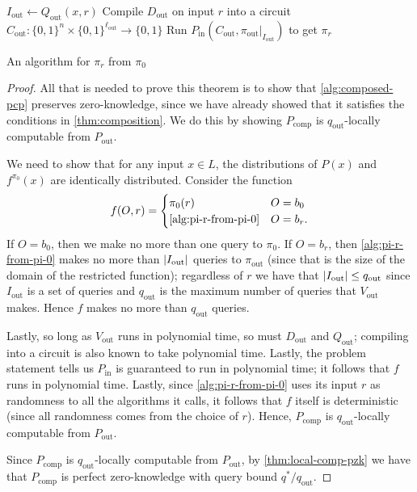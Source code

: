 \documentclass[english,12pt]{reedthesis}
\theoremstyle{plain}
\theoremstyle{definition}
\theoremstyle{remark}
\DeclareMathOperator{\comp}{comp}
\DeclareMathOperator{\out}{out}
\DeclareMathOperator{\oin}{in}
\DeclarePairedDelimiter{\abs}{\lvert}{\rvert}
\begin{document}
\begin{algorithm}[htbp]
  \KwIn{A string $r \in \{0, 1\}^{r_{\out}}$}
  $I_{\out} \leftarrow Q_{\out}(x, r)$\;
  Compile $D_{\out}$ on input $r$ into a circuit
  $C_{\out}: \{0, 1\}^{n} \times \{0, 1\}^{\ell_{\out}} \rightarrow \{0, 1\}$\;
  Run $P_{\oin}(C_{\out}, \pi_{\out}|_{I_{\out}})$ to get $\pi_{r}$\;
  \;
  \caption{An algorithm for $\pi_{r}$ from $\pi_{0}$}\label{alg:pi-r-from-pi-0}
\end{algorithm}

\begin{proof}
  All that is needed to prove this theorem is to show that
  \cref{alg:composed-pcp} preserves zero-knowledge, since we have already showed
  that it satisfies the conditions in \cref{thm:composition}. We do this by
  showing $P_{\comp}$ is $q_{\out}$-locally computable from $P_{\out}$.

  We need to show that for any input $x \in L$, the distributions of $P(x)$ and
  $f^{\pi_{0}}(x)$ are identically distributed. Consider the function
  \begin{equation}
    f(O, r) = \begin{cases}
      \pi_{0}(r) & O = b_{0} \\
      \text{\cref{alg:pi-r-from-pi-0}} & O = b_{r}.
    \end{cases}
  \end{equation}
  If $O = b_{0}$, then we make no more than one query to $\pi_{0}$. If
  $O = b_{r}$, then \cref{alg:pi-r-from-pi-0} makes no more than
  $\abs{I_{\out}}$ queries to $\pi_{\out}$ (since that is the size of the domain
  of the restricted function); regardless of $r$ we have that
  $\abs{I_{\out}} \le q_{\out}$ since $I_{\out}$ is a set of queries and
  $q_{\out}$ is the maximum number of queries that $V_{\out}$ makes. Hence $f$
  makes no more than $q_{\out}$ queries.

  Lastly, so long as $V_{\out}$ runs in polynomial time, so must $D_{\out}$ and
  $Q_{\out}$; compiling into a circuit is also known to take polynomial time.
  Lastly, the problem statement tells us $P_{\oin}$ is guaranteed to run in
  polynomial time; it follows that $f$ runs in polynomial time. Lastly, since
  \cref{alg:pi-r-from-pi-0} uses its input $r$ as randomness to all the
  algorithms it calls, it follows that $f$ itself is deterministic (since all
  randomness comes from the choice of $r$). Hence, $P_{\comp}$ is
  $q_{\out}$-locally computable from $P_{\out}$.

  Since $P_{\comp}$ is $q_{\out}$-locally computable from $P_{\out}$, by
  \cref{thm:local-comp-pzk} we have that $P_{\comp}$ is perfect zero-knowledge
  with query bound $q^{*}/q_{\out}$.
\end{proof}
\end{document}
